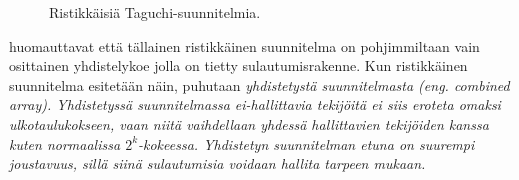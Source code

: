 \documentclass[12pt,a4paper,finnish]{tutthesis}
\begin{document}
\begin{figure}
  \begin{center}

    \caption[Ristikkäisiä suunnitelmia]{Ristikkäisiä Taguchi-suunnitelmia.}

    \label{fig:prosessi}
  \end{center}
\end{figure}




\textcite{shoemaker1991} huomauttavat että tällainen ristikkäinen
suunnitelma on pohjimmiltaan vain osittainen yhdistelykoe jolla
on tietty sulautumisrakenne. Kun ristikkäinen suunnitelma esitetään
näin, puhutaan \em yhdistetystä suunnitelmasta \em (eng. combined
array). Yhdistetyssä suunnitelmassa ei-hallittavia
tekijöitä ei siis eroteta omaksi ulkotaulukokseen, vaan niitä vaihdellaan yhdessä hallittavien
tekijöiden kanssa kuten normaalissa \(2^k\)-kokeessa.
Yhdistetyn suunnitelman etuna on suurempi joustavuus, sillä siinä sulautumisia
voidaan hallita tarpeen mukaan.
\end{document}
